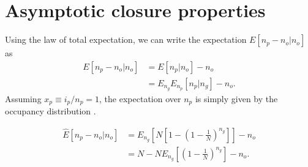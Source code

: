 \documentclass[review]{elsarticle}
\newcommand{\dslash}{/\!\!/}
\newcommand{\sgcomment}[1]{{\color{red}{SG: #1}}}
\begin{document}
\section{Asymptotic closure properties}
\label{sec:asympt}






Using the law of total expectation, we can write the expectation $E[n_p-n_o | n_o]$ as 
\begin{equation*}
  \begin{aligned}
    \label{eq:lineages-approx}
    E[n_p-n_o | n_o] &=        E[n_p | n_o]       - n_o \\
                     &=E_{n_g} E_{n_p}[n_p | n_g] - n_o.
  \end{aligned}
\end{equation*}
Assuming $x_p\equiv i_p/n_p=1$, the expectation over $n_p$ is simply given by the occupancy distribution \cite{Wakeley2009}.

\begin{equation*}
  \begin{aligned}
    \label{eq:lineages-derive}
    \hat{E}[n_p -n_o | n_o]
    & =   E_{n_g}\left[N\left[1-\left(1 - \frac{1}{N} \right)^{n_g} \right]\right]- n_o\\
    & =   N-N  E_{n_g}\left[\left(1 - \frac{1}{N} \right)^{n_g} \right] -n_o. 
  \end{aligned}
\end{equation*}
\end{document}
